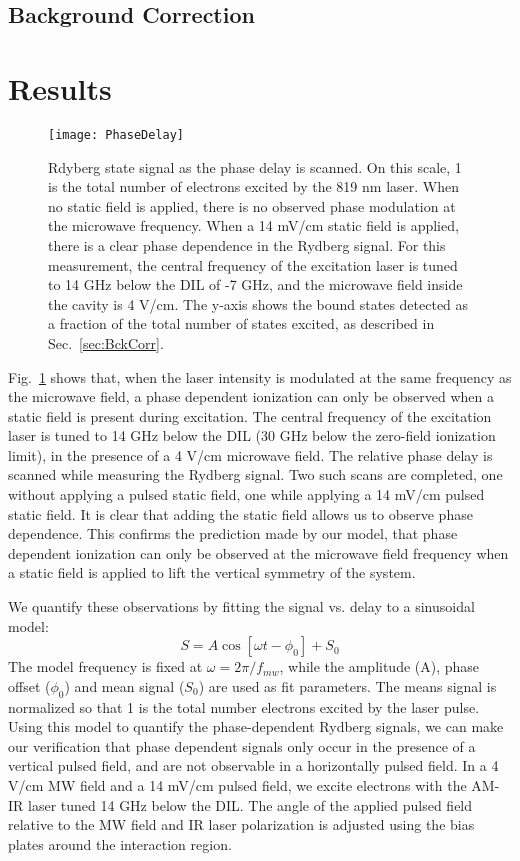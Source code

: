 \documentclass[aps,pra,preprint,groupedaddress]{revtex4-1}
\begin{document}
\subsection{\label{sec:BckCorr} Background Correction}


\section{\label{results} Results}

\begin{figure}
	\texttt{[image: PhaseDelay]}
	\caption{Rdyberg state signal as the phase delay is scanned. On this scale, 1 is the total number of electrons excited by the 819 nm laser. When no static field is applied, there is no observed phase modulation at the microwave frequency. When a 14 mV/cm static field is applied, there is a clear phase dependence in the Rydberg signal. For this measurement, the central frequency of the excitation laser is tuned to 14 GHz below the DIL of -7 GHz, and the microwave field inside the cavity is 4 V/cm. The y-axis shows the bound states detected as a fraction of the total number of states excited, as described in Sec.~\ref{sec:BckCorr}.}
	\label{fig:PhaseDelay}
\end{figure}

Fig.~\ref{fig:PhaseDelay} shows that, when the laser intensity is modulated at the same frequency as the microwave field, a phase dependent ionization can only be observed when a static field is present during excitation. The central frequency of the excitation laser is tuned to 14 GHz below the DIL (30 GHz below the zero-field ionization limit), in the presence of a 4 V/cm microwave field. The relative phase delay is scanned while measuring the Rydberg signal. Two such scans are completed, one without applying a pulsed static field, one while applying a 14 mV/cm pulsed static field. It is clear that adding the static field allows us to observe phase dependence. This confirms the prediction made by our model, that phase dependent ionization can only be observed at the microwave field frequency when a static field is applied to lift the vertical symmetry of the system.

We quantify these observations by fitting the signal vs. delay to a sinusoidal model:
\begin{equation} \label{eq:modfit}
S = A \cos{[\omega t - \phi_0]} + S_0
\end{equation}
The model frequency is fixed at $\omega = 2\pi / f_{mw}$, while the amplitude (A), phase offset ($\phi_0$) and mean signal ($S_0$) are used as fit parameters. The means signal is normalized so that 1 is the total number electrons excited by the laser pulse. Using this model to quantify the phase-dependent Rydberg signals, we can make our verification that phase dependent signals only occur in the presence of a vertical pulsed field, and are not observable in a horizontally pulsed field. In a 4 V/cm MW field and a 14 mV/cm pulsed field, we excite electrons with the AM-IR laser tuned 14 GHz below the DIL. The angle of the applied pulsed field relative to the MW field and IR laser polarization is adjusted using the bias plates around the interaction region.
\end{document}
